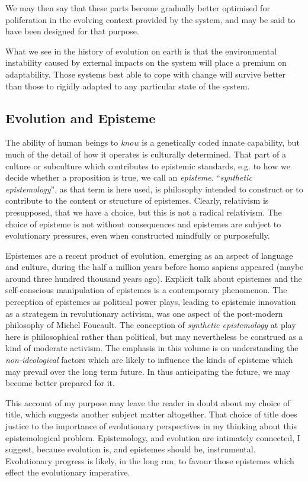 We may then say that these parts become gradually better optimised for poliferation in the evolving context provided by the system, and may be said to have been designed for that purpose.

What we see in the history of evolution on earth is that the environmental instability caused by external impacts on the system will place a premium on adaptability.
Those systems best able to cope with change will survive better than those to rigidly adapted to any particular state of the system.

\subsection{Evolution and Episteme}

The ability of human beings to \emph{know} is a genetically coded innate capability, but much of the detail of how it operates is culturally determined.
That part of a culture or subculture which contributes to epistemic standards, e.g. to how we decide whether a proposition is true, we call an \emph{episteme}.
``\emph{synthetic epistemology}'', as that term is here used, is philosophy intended to construct or to contribute to the content or structure of epistemes.
Clearly, relativism is presupposed, that we have a choice, but this is not a radical relativism.
The choice of episteme is not without consequences and epistemes are subject to evolutionary pressures, even when constructed mindfully or purposefully.

Epistemes are a recent product of evolution, emerging as an aspect of language and culture, during the half a million years before homo sapiens appeared (maybe around three hundred thousand years ago).
Explicit talk about epistemes and the self-conscious manipulation of epistemes is a contemporary phenomenon.
The perception of epistemes as political power plays, leading to epistemic innovation as a strategem in revolutionary activism, was one aspect of the post-modern philosophy of  Michel Foucault.
The conception of \emph{synthetic epistemology} at play here is philosophical rather than political, but may nevertheless be construed as a kind of moderate activism.
The emphasis in this volume is on understanding the \emph{non-ideological} factors which are likely to influence the kinds of episteme which may prevail over the long term future.
In thus anticipating the future, we may become better prepared for it.

This account of my purpose may leave the reader in doubt about my choice of title, which suggests another subject matter altogether.
That choice of title does justice to the importance of evolutionary perspectives in my thinking about this epistemological problem.
Epistemology, and evolution are intimately connected, I suggest, because evolution is, and epistemes should be, instrumental.
Evolutionary progress is likely, in the long run, to favour those epistemes which effect the evolutionary imperative.

